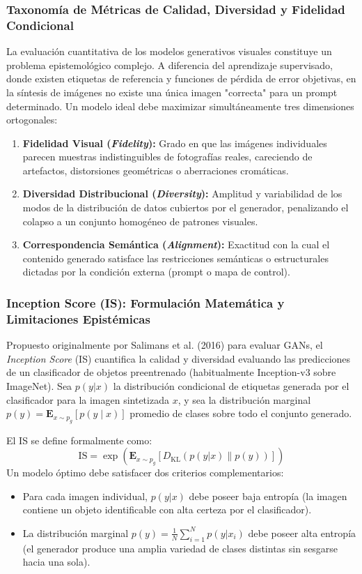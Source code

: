 \subsubsection{Taxonomía de Métricas de Calidad, Diversidad y Fidelidad Condicional}

La evaluación cuantitativa de los modelos generativos visuales constituye un problema epistemológico complejo. A diferencia del aprendizaje supervisado, donde existen etiquetas de referencia y funciones de pérdida de error objetivas, en la síntesis de imágenes no existe una única imagen "correcta" para un prompt determinado. Un modelo ideal debe maximizar simultáneamente tres dimensiones ortogonales:
\begin{enumerate}
    \item \textbf{Fidelidad Visual (\textit{Fidelity}):} Grado en que las imágenes individuales parecen muestras indistinguibles de fotografías reales, careciendo de artefactos, distorsiones geométricas o aberraciones cromáticas.
    \item \textbf{Diversidad Distribucional (\textit{Diversity}):} Amplitud y variabilidad de los modos de la distribución de datos cubiertos por el generador, penalizando el colapso a un conjunto homogéneo de patrones visuales.
    \item \textbf{Correspondencia Semántica (\textit{Alignment}):} Exactitud con la cual el contenido generado satisface las restricciones semánticas o estructurales dictadas por la condición externa (prompt o mapa de control).
\end{enumerate}

\subsubsection{Inception Score (IS): Formulación Matemática y Limitaciones Epistémicas}

Propuesto originalmente por Salimans et al. (2016) para evaluar GANs, el \textit{Inception Score} (IS) cuantifica la calidad y diversidad evaluando las predicciones de un clasificador de objetos preentrenado (habitualmente Inception-v3 sobre ImageNet). Sea $p(y|x)$ la distribución condicional de etiquetas generada por el clasificador para la imagen sintetizada $x$, y sea la distribución marginal $p(y) = \mathbf{E}_{x \sim p_g}[p(y \mid x)]$ promedio de clases sobre todo el conjunto generado.

El IS se define formalmente como:
\begin{equation}
\mathrm{IS} = \exp\left( \mathbf{E}_{x \sim p_g} \left[ D_{\mathrm{KL}}(p(y|x) \parallel p(y)) \right] \right)
\end{equation}
Un modelo óptimo debe satisfacer dos criterios complementarios:
\begin{itemize}[itemsep=0.4em]
    \item Para cada imagen individual, $p(y|x)$ debe poseer baja entropía (la imagen contiene un objeto identificable con alta certeza por el clasificador).
    \item La distribución marginal $p(y) = \frac{1}{N} \sum_{i=1}^N p(y|x_i)$ debe poseer alta entropía (el generador produce una amplia variedad de clases distintas sin sesgarse hacia una sola).
\end{itemize}

